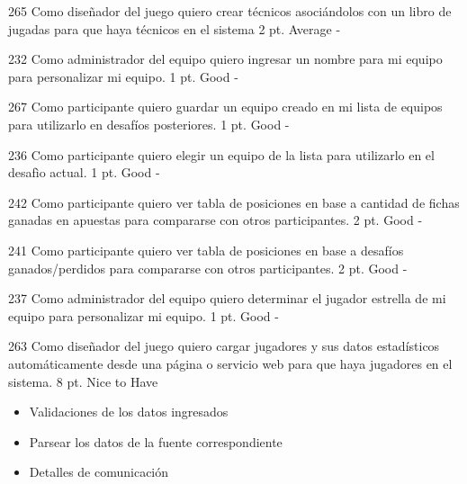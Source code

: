 \vspace{1cm}

\simplestory
{265}
{Como diseñador del juego quiero crear técnicos asociándolos con un libro de jugadas para que haya técnicos en el sistema}
{2 pt.}
{Average}
{-}

\vspace{1cm}

\simplestory
{232}
{Como administrador del equipo quiero ingresar un nombre para mi equipo para personalizar mi equipo.}
{1 pt.}
{Good}
{-}

\vspace{1cm}

\simplestory
{267}
{Como participante quiero guardar un equipo creado en mi lista de equipos para utilizarlo en desafíos posteriores.}
{1 pt.}
{Good}
{-}

\vspace{1cm}

\simplestory
{236}
{Como participante quiero elegir un equipo de la lista para utilizarlo en el desafìo actual.}
{1 pt.}
{Good}
{-}

\vspace{1cm}

\simplestory
{242}
{Como participante quiero ver tabla de posiciones en base a cantidad de fichas ganadas en apuestas para compararse con otros participantes.}
{2 pt.}
{Good}
{-}

\vspace{1cm}

\simplestory
{241}
{Como participante quiero ver tabla de posiciones en base a desafíos ganados/perdidos para compararse con otros participantes.}
{2 pt.}
{Good}
{-}

\vspace{1cm}

\simplestory
{237}
{Como administrador del equipo quiero determinar el jugador estrella de mi equipo para personalizar mi equipo.}
{1 pt.}
{Good}
{-}

\vspace{1cm}

\simplestory
{263}
{Como diseñador del juego quiero cargar jugadores y sus datos estadísticos automáticamente desde una página o servicio web para que haya jugadores en el sistema.}
{8 pt.}
{Nice to Have}
{\begin{itemize}
\item Validaciones de los datos ingresados
\item Parsear los datos de la fuente correspondiente
\item Detalles de comunicación
\end{itemize}}

